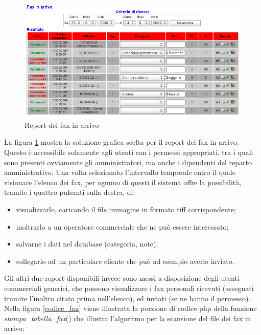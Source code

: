 \newpage
\begin{figure}[!ht]
\centering
  \includegraphics[scale=0.8]{./images/faxinarrivo.png}
\caption{Report dei fax in arrivo}
\label{fax_in_arrivo}
\end{figure}

\noindent
La figura \ref{fax_in_arrivo} mostra la soluzione grafica scelta per il report dei fax in arrivo. Questo \`e accessibile solamente agli utenti con i permessi appropriati, tra i quali sono presenti ovviamente gli amministratori, ma anche i dipendenti del reparto amministrativo. Una volta selezionato l'intervallo temporale entro il quale visionare l'elenco dei fax, per ognuno di questi il sistema offre la possibilit\`a, tramite i quattro pulsanti sulla destra, di:

\begin{itemize}
 \item visualizzarlo, caricando il file immagine in formato tiff corrispondente;
 \item inoltrarlo a un operatore commerciale che ne pu\`o essere interessato;
 \item salvarne i dati nel database (categoria, note);
 \item collegarlo ad un particolare cliente che pu\`o ad esempio averlo inviato.
\end{itemize}

Gli altri due report disponibili invece sono messi a disposizione degli utenti commerciali generici, che possono visualizzare i fax personali ricevuti (assegnati tramite l'inoltro citato prima nell'elenco), ed inviati (se ne hanno il permesso).
\newpage
Nella figura \ref{codice_fax} viene illustrata la porzione di codice php della funzione \textit{stampa\_{}tabella\_{}fax}() che illustra l'algoritmo per la scansione del file dei fax in arrivo:

